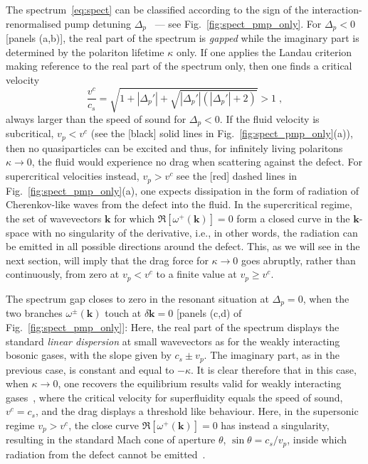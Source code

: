 
The spectrum~\eqref{eq:spect} can be classified according to the sign
of the interaction-renormalised pump detuning
$\Delta_p$~\cite{Carusotto_2004,Ciuti_2005} --- see
Fig.~\ref{fig:spect_pmp_only}. For $\Delta_p<0$ [panels (a,b)], the real part
of the spectrum is \emph{gapped} while the imaginary part is
determined by the polariton lifetime $\kappa$ only. If one applies the
Landau criterion making reference to the real part of the spectrum
only, then one finds a critical velocity
%
\begin{equation}
  \frac{v^c}{c_s} = \sqrt{1 + |\Delta_p'| +
    \sqrt{|\Delta_p'|(|\Delta_p'| + 2)}} > 1\; ,
\label{eq:criti}
\end{equation}
%
always larger than the speed of sound for $\Delta_p<0$. If the fluid
velocity is subcritical, $v_p<v^c$ (see the [black] solid lines in
Fig.~\ref{fig:spect_pmp_only}(a)), then no quasiparticles can be excited and
thus, for infinitely living polaritons $\kappa \to 0$, the fluid would
experience no drag when scattering against the defect. For
supercritical velocities instead, $v_p>v^c$ see the [red] dashed lines in
Fig.~\ref{fig:spect_pmp_only}(a), one expects dissipation in the form of
radiation of Cherenkov-like waves from the defect into the fluid. In
the supercritical regime, the set of wavevectors $\bm{k}$ for which
$\Re[\omega^{+} (\bm{k})] = 0$ form a closed curve in the
$\bm{k}$-space with no singularity of the derivative, i.e., in other
words, the radiation can be emitted in all possible directions around
the defect. This, as we will see in the next section, will imply that
the drag force for $\kappa \to 0$ goes abruptly, rather than
continuously, from zero at $v_p<v^c$ to a finite value at $v_p \ge
v^c$.


The spectrum gap closes to zero in the resonant situation at
$\Delta_p=0$, when the two branches $\omega^{\pm} (\bm{k})$ touch at
$\delta \bm{k}=0$ [panels (c,d) of Fig.~\ref{fig:spect_pmp_only}]: Here, the
real part of the spectrum displays the standard \emph{linear
  dispersion} at small wavevectors as for the weakly interacting
bosonic gases, with the slope given by $c_s \pm v_p$. The imaginary
part, as in the previous case, is constant and equal to $-\kappa$. It
is clear therefore that in this case, when $\kappa \to 0$, one
recovers the equilibrium results valid for weakly interacting
gases~\cite{Astrakharchik_2004,Carusotto_2006}, where the critical
velocity for superfluidity equals the speed of sound, $v^c=c_s$, and
the drag displays a threshold like behaviour. Here, in the supersonic
regime $v_p> v^c$, the close curve $\Re[ \omega^{+} (\bm{k})] = 0$
has instead a singularity, resulting in the standard Mach cone of
aperture $\theta$, $\sin \theta = c_s/v_p$, inside which radiation
from the defect cannot be emitted~\cite{Carusotto_2006}.

